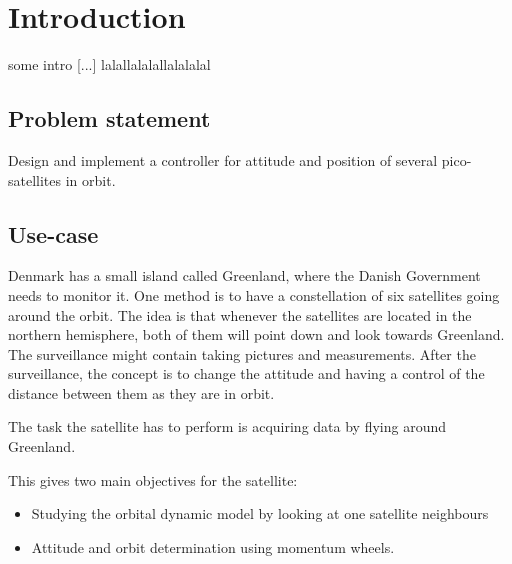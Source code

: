 \chapter{Introduction}\label{chap:Introduction}
%
\cite{Biezl}
some intro [...]
lalallalalallalalalal
%
\section{Problem statement}
%
Design and implement a controller for attitude and position of several pico-satellites in orbit.
%
\section{Use-case}\label{sec:useCase}
%
Denmark has a small island called Greenland, where the Danish Government needs to monitor it.
One method is to have a constellation of six satellites going around the orbit. The idea is that whenever the satellites are located in the northern hemisphere, both of them will point down and look towards Greenland. The surveillance might contain taking pictures and measurements. After the surveillance, the concept is to change the attitude and having a control of the distance between them as they are in orbit.

The task the satellite has to perform is acquiring data by flying around Greenland.

This gives two main objectives for the satellite: 
\vspace{-0.5cm}
\begin{itemize}
	\item Studying the orbital dynamic model by looking at one satellite neighbours 
	\item Attitude and orbit determination using momentum wheels.
\end{itemize}
%